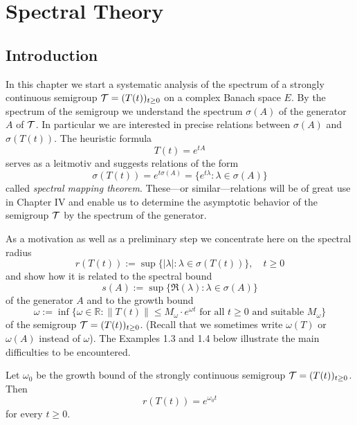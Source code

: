 \setcounter{chapter}{2}
\setcounter{section}{1}
\chapter{Spectral Theory}\label{chap:a3}
\section{Introduction}
In this chapter we start a systematic analysis of the spectrum of a strongly continuous semigroup $\mathcal{T} = (T(t))_{t\geq 0}$ on a complex Banach space $E$.
By the spectrum of the semigroup we understand the spectrum $\sigma(A)$ of the generator $A$ of $\mathcal{T}$.
In particular we are interested in precise relations between $\sigma(A)$ and $\sigma(T(t))$.
The heuristic formula
\[
	T(t) = e^{tA}
\]
serves as a leitmotiv and suggests relations of the form
\[
\sigma(T(t)) = e^{t\sigma(A)} = \{ e^{t\lambda} \colon \lambda \in \sigma(A) \}
\]
called \emph{spectral mapping theorem}.
These---or similar---relations will be of great use in Chapter IV and enable us to determine the asymptotic behavior of the semigroup $\mathcal{T}$ by the spectrum of the generator.

As a motivation as well as a preliminary step we concentrate here on the spectral radius
\begin{equation}\label{eq:a3-1.1}
	r(T(t)) := \sup \{ |\lambda| : \lambda \in \sigma(T(t)) \}, \quad t \geq 0
\end{equation}
and show how it is related to the spectral bound
\begin{equation}\label{eq:a3-1.2}
	s(A) := \sup \{ \Re(\lambda) : \lambda \in \sigma(A) \}
\end{equation}
of the generator $A$ and to the growth bound
\begin{equation}\label{eq:a3-1.3}
	\omega := \inf \{\omega \in \mathbb{R} : \|T(t)\| \leq M_{\omega}\cdot e^{\omega t} \text{ for all } t \geq 0 \text{ and suitable } M_{\omega}\}
\end{equation}
of the semigroup $\mathcal{T} = (T(t))_{t\geq 0}$.
(Recall that we sometimes write $\omega(T)$ or $\omega(A)$ instead of $\omega$).
The Examples 1.3 and 1.4 below illustrate the main difficulties to be encountered.
\begin{proposition}\label{prop:1.1}
Let $\omega_{0}$ be the growth bound of the strongly continuous semigroup $\mathcal{T} = (T(t))_{t\geq 0}$.
Then
\[
r(T(t)) = e^{\omega_{0} t}
\]
for every $t \geq 0$.
\end{proposition}

